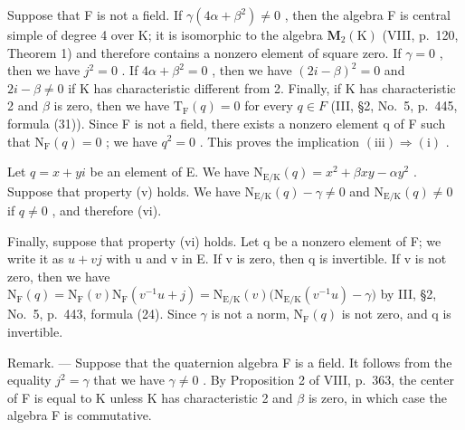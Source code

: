 Suppose that F is not a field. If \(\gamma(4\alpha+\beta^{2})\neq0\) , then the algebra F is central simple of degree 4 over K; it is isomorphic to the algebra \(\mathbf{M}_{2}(\mathrm{K})\) (VIII, p.~120, Theorem 1) and therefore contains a nonzero element of square zero. If \(\gamma=0\) , then we have \(j^{2}=0\) . If \(4\alpha+\beta^{2}=0\) , then we have \((2i-\beta)^{2}=0\) and \(2i-\beta\neq0\) if K has characteristic different from 2. Finally, if K has characteristic 2 and \(\beta\) is zero, then we have \(\mathrm{T}_{\mathrm{F}}(q)=0\) for every \(q\in F\) (III, §2, No.~5, p.~445, formula (31)). Since F is not a field, there exists a nonzero element q of F such that \(\mathrm{N}_{\mathrm{F}}(q)=0\) ; we have \(q^{2}=0\) . This proves the implication \((\mathrm{iii})\Rightarrow(\mathrm{i})\) .

Let \(q = x + yi\) be an element of E. We have \(\mathrm{N}_{\mathrm{E / K}}(q) = x^2 + \beta xy - \alpha y^2\) . Suppose that property (v) holds. We have \(\mathrm{N}_{\mathrm{E / K}}(q) - \gamma \neq 0\) and \(\mathrm{N}_{\mathrm{E / K}}(q) \neq 0\) if \(q \neq 0\) , and therefore (vi).

Finally, suppose that property (vi) holds. Let q be a nonzero element of F; we write it as \(u + vj\) with u and v in E. If v is zero, then q is invertible. If v is not zero, then we have \(\mathrm{N}_{\mathrm{F}}(q) = \mathrm{N}_{\mathrm{F}}(v)\mathrm{N}_{\mathrm{F}}(v^{-1}u + j) = \mathrm{N}_{\mathrm{E}/\mathrm{K}}(v)\big(\mathrm{N}_{\mathrm{E}/\mathrm{K}}(v^{-1}u) - \gamma\big)\) by III, §2, No.~5, p.~443, formula (24). Since \(\gamma\) is not a norm, \(\mathrm{N}_{\mathrm{F}}(q)\) is not zero, and q is invertible.

Remark. --- Suppose that the quaternion algebra F is a field. It follows from the equality \(j^{2} = \gamma\) that we have \(\gamma \neq 0\) . By Proposition 2 of VIII, p.~363, the center of F is equal to K unless K has characteristic 2 and \(\beta\) is zero, in which case the algebra F is commutative.

